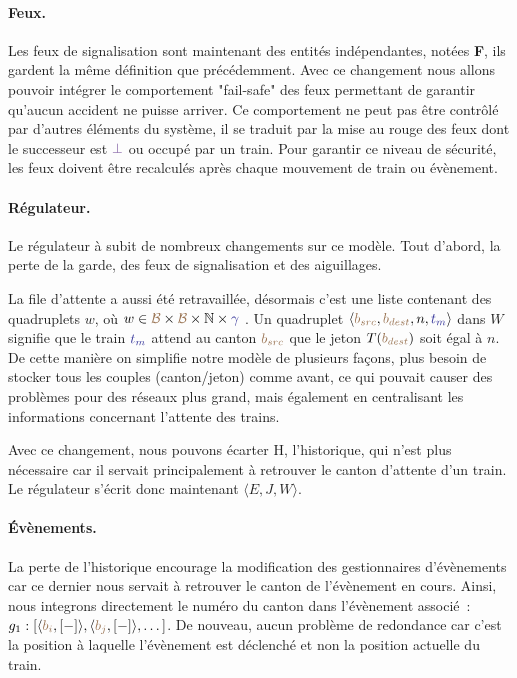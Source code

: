 \documentclass[oneside, a4paper, 11pt]{book}
\newcommand{\nats}{\ensuremath{\mathbb{N}}}
\newcommand{\trainFmt}[1]{{\color{traincolor} #1}}
\newcommand{\tid}[1]{\ensuremath{\trainFmt{t_{#1}}}}
\newcommand{\posFmt}[1]{{\color{poscolor}{#1}}}
\newcommand{\bid}[1]{\ensuremath{\posFmt{b_{#1}}}}
\newcommand{\tokenOf}[1]{\ensuremath{T(\posFmt{#1})}}
\newcommand{\swFmt}[1]{{\color{swcolor}{#1}}}
\newcommand{\nosuc}{\ensuremath{\swFmt{\bot}}}
\begin{document}
\paragraph{Feux.}Les feux de signalisation sont maintenant des entités indépendantes, notées \textbf{F}, ils gardent la même définition que précédemment. Avec ce changement nous allons pouvoir intégrer le comportement "fail-safe" des feux permettant de garantir qu'aucun accident ne puisse arriver.
Ce comportement ne peut pas être contrôlé par d'autres éléments du système, il se traduit par la mise au rouge des feux dont le successeur est $\nosuc$ ou occupé par un train. 
Pour garantir ce niveau de sécurité, les feux doivent être recalculés après chaque mouvement de train ou évènement.


\paragraph{Régulateur.} Le régulateur à subit de nombreux changements sur ce modèle. Tout d'abord, la perte de la garde, des feux de signalisation et des aiguillages.

La file d'attente a aussi été retravaillée, désormais c'est une liste contenant des quadruplets $w$, où $w \in \posFmt{\mathcal{B}} \times \posFmt{\mathcal{B}} \times \nats \times \trainFmt{\gamma}$ . Un quadruplet $\langle \bid{src}, \bid{dest}, n, \tid{m} \rangle$ dans $W$ signifie que le train \tid{m} attend au canton \bid{src} que le jeton \tokenOf{\bid{dest}} soit égal à $n$.
De cette manière on simplifie notre modèle de plusieurs façons, plus besoin de stocker tous les couples (canton/jeton) comme avant, ce qui pouvait causer des problèmes pour des réseaux plus grand, mais également en centralisant les informations concernant l'attente des trains. 

Avec ce changement, nous pouvons écarter H, l'historique, qui n'est plus nécessaire car il servait principalement à retrouver le canton d'attente d'un train.
Le régulateur s'écrit donc maintenant $\langle E, J, W \rangle$.

\paragraph{Évènements.} La perte de l'historique encourage la modification des gestionnaires d'évènements car ce dernier nous servait à retrouver le canton de l'évènement en cours. Ainsi, nous integrons directement le numéro du canton dans l'évènement associé~: $g_1 : [\langle \bid{i}, [-]\rangle, \langle \bid{j}, [-]\rangle,\dots]$.
De nouveau, aucun problème de redondance car c'est la position à laquelle l'évènement est déclenché et non la position actuelle du train.
\end{document}
